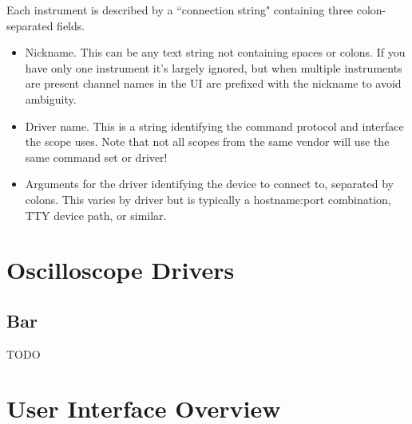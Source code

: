 \documentclass[11pt]{article}
\begin{document}
Each instrument is described by a ``connection string" containing three colon-separated fields.

\begin{itemize}
\item Nickname. This can be any text string not containing spaces or colons. If you have only one instrument it's
largely ignored, but when multiple instruments are present channel names in the UI are prefixed with the nickname to
avoid ambiguity.
\item Driver name. This is a string identifying the command protocol and interface the scope uses. Note that not all
scopes from the same vendor will use the same command set or driver!
\item Arguments for the driver identifying the device to connect to, separated by colons. This varies by driver but is
typically a hostname:port combination, TTY device path, or similar.
\end{itemize}

\pagebreak
\section{Oscilloscope Drivers}

\subsection{Bar}
TODO

\pagebreak
\section{User Interface Overview}
\end{document}

